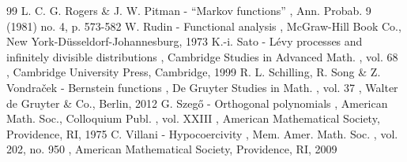\documentclass[11pt]{article}
\numberwithin{equation}{section}
\theoremstyle{plain}
\theoremstyle{definition}
\begin{document}
\begin{thebibliography}{99}
 L. C. G. Rogers \& J. W. Pitman - “Markov functions” , Ann. Probab. 9 (1981) no. 4, p. 573-582
 W. Rudin - Functional analysis , McGraw-Hill Book Co., New York-Düsseldorf-Johannesburg, 1973
 K.-i. Sato - Lévy processes and infinitely divisible distributions , Cambridge Studies in Advanced Math. , vol. 68 , Cambridge University Press, Cambridge, 1999
 R. L. Schilling, R. Song \& Z. Vondraček - Bernstein functions , De Gruyter Studies in Math. , vol. 37 , Walter de Gruyter \& Co., Berlin, 2012
 G. Szegő - Orthogonal polynomials , American Math. Soc., Colloquium Publ. , vol. XXIII , American Mathematical Society, Providence, RI, 1975
 C. Villani - Hypocoercivity , Mem. Amer. Math. Soc. , vol. 202, no. 950 , American Mathematical Society, Providence, RI, 2009
\end{thebibliography}
\end{document}
